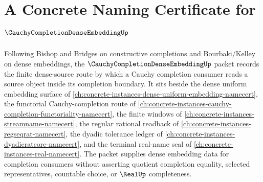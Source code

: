 \chapter{A Concrete Naming Certificate for $\CauchyCompletionDenseEmbeddingUp$}
\label{ch:concrete-instances-cauchy-completion-dense-embedding-namecert}

Following Bishop and Bridges on constructive completions and Bourbaki/Kelley on dense embeddings, the $\CauchyCompletionDenseEmbeddingUp$ packet records the finite dense-source route by which a Cauchy completion consumer reads a source object inside its completion boundary. It sits beside the dense uniform embedding surface of \autoref{ch:concrete-instances-dense-uniform-embedding-namecert}, the functorial Cauchy-completion route of \autoref{ch:concrete-instances-cauchy-completion-functoriality-namecert}, the finite windows of \autoref{ch:concrete-instances-streamname-namecert}, the regular rational readback of \autoref{ch:concrete-instances-regseqrat-namecert}, the dyadic tolerance ledger of \autoref{ch:concrete-instances-dyadicratcore-namecert}, and the terminal real-name seal of \autoref{ch:concrete-instances-real-namecert}. The packet supplies dense embedding data for completion consumers without asserting quotient completion equality, selected representatives, countable choice, or $\RealUp$ completeness.

